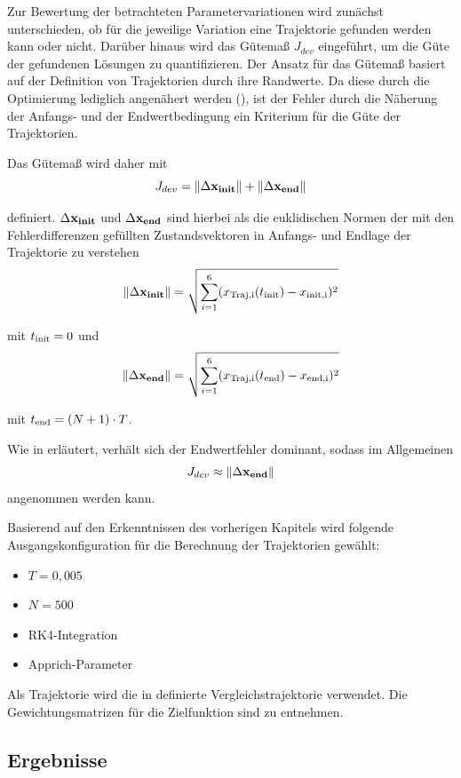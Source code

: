 Zur Bewertung der betrachteten Parametervariationen wird zunächst unterschieden, ob für die jeweilige Variation eine Trajektorie gefunden werden kann oder nicht. Darüber hinaus wird das Gütemaß $J_{dev}$ eingeführt, um die Güte der gefundenen Lösungen zu quantifizieren. Der Ansatz für das Gütemaß basiert auf der Definition von Trajektorien durch ihre Randwerte. Da diese durch die Optimierung lediglich angenähert werden (\vgl {}), ist der Fehler durch die Näherung der Anfangs- und der Endwertbedingung ein Kriterium für die Güte der Trajektorien.

Das Gütemaß wird daher mit
	\[
	J_{dev} = \left\| \Delta \boldsymbol{\mathrm{x_{\mathrm{init}}}} \right\| + \left\| \Delta \boldsymbol{\mathrm{x_{\mathrm{end}}}} \right\|
	\]
	
definiert. $\Delta \boldsymbol{\mathrm{x_{\mathrm{init}}}}$ und $\Delta \boldsymbol{\mathrm{x_{\mathrm{end}}}}$ sind hierbei als die euklidischen Normen der mit den Fehlerdifferenzen gefüllten Zustandsvektoren in Anfangs- und Endlage der Trajektorie zu verstehen
\[
	\left\| \Delta \boldsymbol{\mathrm{x_{\mathrm{init}}}} \right\| = \sqrt{ \sum_{i=1}^6 ( x_{\mathrm{Traj,i}}(t_{\mathrm{init}}) - x_{\mathrm{init,i}} )^2 }
\]

mit $t_{\mathrm{init}} = 0$ und
	\[
	\left\| \Delta \boldsymbol{\mathrm{x_{\mathrm{end}}}} \right\| = \sqrt{ \sum_{i=1}^6 ( x_{\mathrm{Traj,i}}(t_{\mathrm{end}}) - x_{\mathrm{end,i}} )^2 }
\]

mit $t_{\mathrm{end}} = (N+1) \cdot T$.

Wie in  erläutert, verhält sich der Endwertfehler dominant, sodass im Allgemeinen
\[
	J_{dev} \approx \left\| \Delta \boldsymbol{\mathrm{x_{\mathrm{end}}}} \right\|
	\]	 
angenommen werden kann.



Basierend auf den Erkenntnissen des vorherigen Kapitels wird folgende Ausgangskonfiguration für die Berechnung der Trajektorien gewählt:
\begin{itemize}
	\item $T = 0,005$
	\item $N = 500$
	\item RK4-Integration
	\item Apprich-Parameter
\end{itemize}

Als Trajektorie wird die in  definierte Vergleichstrajektorie verwendet. Die Gewichtungsmatrizen für die Zielfunktion sind  zu entnehmen.


\subsection{Ergebnisse}\label{subsec:trjParTestRes}

